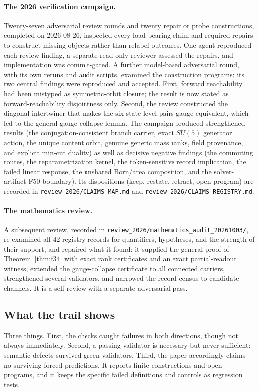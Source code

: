 \paragraph{The 2026 verification campaign.} Twenty-seven adversarial review rounds and twenty repair or probe
constructions, completed on 2026-08-26, inspected every load-bearing claim and required repairs to construct missing
objects rather than relabel outcomes. One agent reproduced each review finding, a separate read-only reviewer assessed
the repairs, and implementation was commit-gated. A further model-based adversarial round, with its own reruns and audit
scripts, examined the construction programs; its two central findings were reproduced and accepted. First, forward
reachability had been mistyped as symmetric-orbit closure; the result is now stated as forward-reachability disjointness
only. Second, the review constructed the diagonal intertwiner that makes the six state-level pairs gauge-equivalent,
which led to the general gauge-collapse lemma. The campaign produced strengthened results (the conjugation-consistent
branch carrier, exact \(SU(5)\) generator action, the unique content orbit, genuine generic mass ranks, field
provenance, and explicit min-cut duality) as well as decisive negative findings (the commuting routes, the
reparametrization kernel, the token-sensitive record implication, the failed linear response, the unshared Born/area
composition, and the solver-artifact F50 boundary). Its dispositions (keep, restate, retract, open program) are
recorded in \nolinkurl{review_2026/CLAIMS_MAP.md} and \nolinkurl{review_2026/CLAIMS_REGISTRY.md}.

\paragraph{The mathematics review.} A subsequent review, recorded in
\nolinkurl{review_2026/mathematics_audit_20261003/}, re-examined all \(42\) registry records for quantifiers,
hypotheses, and the strength of their support, and repaired what it found: it supplied the general proof of
Theorem~\ref{thm:f34} with exact rank certificates and an exact partial-readout witness, extended the gauge-collapse
certificate to all connected carriers, strengthened several validators, and narrowed the record census to candidate
channels. It is a self-review with a separate adversarial pass.

\subsection{What the trail shows}\label{what-the-trail-shows}

Three things. First, the checks caught failures in both directions, though not always immediately. Second, a passing
validator is necessary but never sufficient: semantic defects survived green validators. Third, the paper accordingly
claims no surviving forced predictions. It reports finite constructions and open programs, and it keeps the specific
failed definitions and controls as regression tests.
